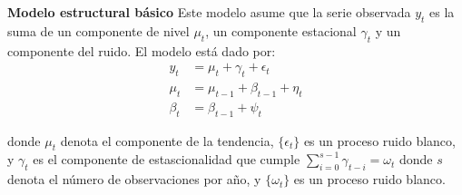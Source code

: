 \begin{Eje}\label{ModEstBas}
\textbf{Modelo estructural básico} Este modelo asume que la serie observada $y_t$ es la suma de un componente de nivel $\mu_t$, un componente estacional $\gamma_t$ y un componente del ruido. El modelo está dado por:
\begin{align*}
y_t&=\mu_t+\gamma_t+\epsilon_t\\
\mu_t&=\mu_{t-1}+\beta_{t-1}+\eta_t\\
\beta_t&=\beta_{t-1}+\psi_t
\end{align*}

donde $\mu_t$ denota el componente de la tendencia, $\{\epsilon_t\}$ es un proceso ruido blanco, y $\gamma_t$ es el componente de estascionalidad que cumple $\sum_{i=0}^{s-1}\gamma_{t-i}=\omega_t$ donde $s$ denota el número de observaciones por año, y $\{\omega_t\}$ es un proceso ruido blanco. 


\end{Eje}

